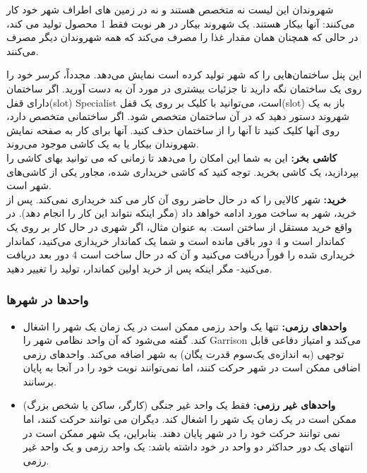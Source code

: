 \documentclass[]{article}
\begin{document}
شهروندان این لیست نه متخصص هستند و نه در زمین های اطراف شهر خود کار می‌کنند: آنها بیکار هستند. یک شهروند بیکار در هر نوبت فقط 1 محصول تولید می کند، در حالی که همچنان همان مقدار غذا را مصرف می‌کند که همه شهروندان دیگر مصرف می‌کنند.

این پنل ساختمان‌هایی را که شهر تولید کرده است نمایش می‌دهد. مجدداً، کرسر خود را روی یک ساختمان نگه دارید تا جزئیات بیشتری در مورد آن به دست آورید. اگر ساختمان دارای قفل(slot) Specialist است، می‌توانید با کلیک بر روی یک قفل(slot)  باز به یک شهروند دستور دهید که در آن ساختمان متخصص شود. اگر ساختمانی متخصص دارد، روی آنها کلیک کنید تا آنها را از ساختمان حذف کنید. آنها برای کار به صفحه نمایش شهروندان بیکار یا به یک کاشی موجود می‌روند.
\\\noindent \textbf{کاشی بخر:}
این به شما این امکان را می‌دهد تا زمانی که می توانید بهای کاشی را بپردازید، یک کاشی بخرید. توجه کنید که کاشی خریداری شده، مجاور یکی از کاشی‌های شهر است.
\\\noindent \textbf{خرید:}
شهر کالایی را که در حال حاضر روی آن کار می کند خریداری نمی‌کند. پس از خرید، شهر به ساخت مورد ادامه خواهد داد (مگر اینکه نتواند این کار را انجام دهد).  در واقع خرید مستقل از ساختن است. به عنوان مثال، اگر شهری در حال کار بر روی یک کماندار است و 4 دور باقی مانده است و شما یک کماندار خریداری می‌کنید، کماندار خریداری شده را فوراً دریافت می‌کنید و آن که در حال ساخت است 4 دور بعد دریافت می‌کنید- مگر اینکه پس از خرید اولین کماندار، تولید را تغییر دهید.

\subsubsection*{{\titr واحدها در شهرها}}
\begin{itemize}
	\item \textbf{واحدهای رزمی:} تنها یک واحد رزمی ممکن است در یک زمان یک شهر را اشغال کند. گفته می‌شود که آن واحد نظامی شهر را Garrison می‌کند و امتیاز دفاعی قابل توجهی (به اندازه‌ی یک‌سوم قدرت یگان) به شهر اضافه می‌کند. واحدهای رزمی اضافی ممکن است در شهر حرکت کنند، اما نمی‌توانند نوبت خود را در آنجا به پایان برسانند.
	\item \textbf{واحدهای غیر رزمی:} فقط یک واحد غیر جنگی (کارگر، ساکن یا شخص بزرگ) ممکن است در یک زمان یک شهر را اشغال کند. دیگران می توانند حرکت کنند، اما نمی توانند حرکت خود را در شهر پایان دهند. بنابراین، یک شهر ممکن است در انتهای یک دور حداکثر دو واحد در خود داشته باشد: یک واحد رزمی و یک واحد غیر رزمی.
\end{itemize}
\end{document}
